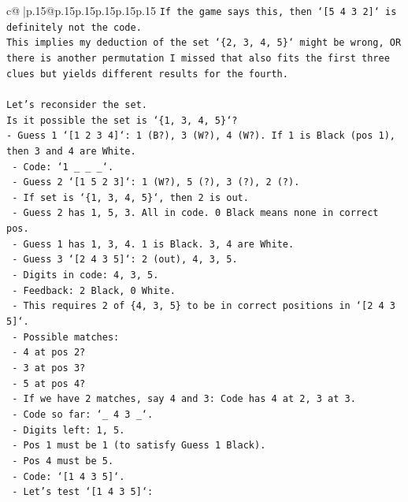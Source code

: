 \documentclass{article}
\begin{document}
{\begin{supertabular}{c@{$\;$}|p{.15\linewidth}@{}p{.15\linewidth}p{.15\linewidth}p{.15\linewidth}p{.15\linewidth}p{.15\linewidth}}
{{{\texttt{If the game says this, then `{[}5 4 3 2{]}` is definitely not the code.} \\
\texttt{This implies my deduction of the set `\{2, 3, 4, 5\}` might be wrong, OR there is another permutation I missed that also fits the first three clues but yields different results for the fourth.} \\
\\ 
\texttt{Let's reconsider the set.} \\
\texttt{Is it possible the set is `\{1, 3, 4, 5\}`?} \\
\texttt{{-} Guess 1 `{[}1 2 3 4{]}`: 1 (B?), 3 (W?), 4 (W?). If 1 is Black (pos 1), then 3 and 4 are White.} \\
\texttt{    {-} Code: `1 \_ \_ \_`.} \\
\texttt{    {-} Guess 2 `{[}1 5 2 3{]}`: 1 (W?), 5 (?), 3 (?), 2 (?).} \\
\texttt{    {-} If set is `\{1, 3, 4, 5\}`, then 2 is out.} \\
\texttt{    {-} Guess 2 has 1, 5, 3. All in code. 0 Black means none in correct pos.} \\
\texttt{    {-} Guess 1 has 1, 3, 4. 1 is Black. 3, 4 are White.} \\
\texttt{    {-} Guess 3 `{[}2 4 3 5{]}`: 2 (out), 4, 3, 5.} \\
\texttt{    {-} Digits in code: 4, 3, 5.} \\
\texttt{    {-} Feedback: 2 Black, 0 White.} \\
\texttt{    {-} This requires 2 of \{4, 3, 5\} to be in correct positions in `{[}2 4 3 5{]}`.} \\
\texttt{    {-} Possible matches:} \\
\texttt{        {-} 4 at pos 2?} \\
\texttt{        {-} 3 at pos 3?} \\
\texttt{        {-} 5 at pos 4?} \\
\texttt{    {-} If we have 2 matches, say 4 and 3: Code has 4 at 2, 3 at 3.} \\
\texttt{        {-} Code so far: `\_ 4 3 \_`.} \\
\texttt{        {-} Digits left: 1, 5.} \\
\texttt{        {-} Pos 1 must be 1 (to satisfy Guess 1 Black).} \\
\texttt{        {-} Pos 4 must be 5.} \\
\texttt{        {-} Code: `{[}1 4 3 5{]}`.} \\
\texttt{    {-} Let's test `{[}1 4 3 5{]}`:} \\
}}}
\end{supertabular}}
\end{document}
